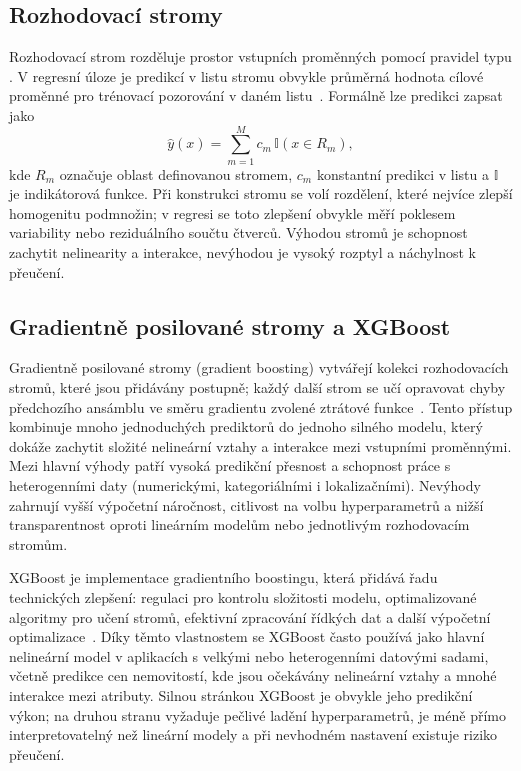 \subsection*{Rozhodovací stromy}
\label{subsec:decision_tree_theory}

Rozhodovací strom rozděluje prostor vstupních proměnných pomocí pravidel typu . V regresní úloze je predikcí v listu stromu obvykle průměrná hodnota cílové proměnné pro trénovací pozorování v daném listu~\cite{Breiman1984CART}. Formálně lze predikci zapsat jako
\begin{equation}
    \hat{y}(x) = \sum_{m=1}^{M} c_m \, \mathbb{I}(x \in R_m),
\end{equation}
kde \(R_m\) označuje oblast definovanou stromem, \(c_m\) konstantní predikci v listu a \(\mathbb{I}\) je indikátorová funkce. Při konstrukci stromu se volí rozdělení, které nejvíce zlepší homogenitu podmnožin; v regresi se toto zlepšení obvykle měří poklesem variability nebo reziduálního součtu čtverců. Výhodou stromů je schopnost zachytit nelinearity a interakce, nevýhodou je vysoký rozptyl a náchylnost k přeučení.

\subsection*{Gradientně posilované stromy a XGBoost}
\label{subsec:gradient_boosting_xgboost}

Gradientně posilované stromy (gradient boosting) vytvářejí kolekci rozhodovacích stromů, které jsou přidávány postupně; každý další strom se učí opravovat chyby předchozího ansámblu ve směru gradientu zvolené ztrátové funkce~\cite{Friedman2001GBM}. Tento přístup kombinuje mnoho jednoduchých prediktorů do jednoho silného modelu, který dokáže zachytit složité nelineární vztahy a interakce mezi vstupními proměnnými. Mezi hlavní výhody patří vysoká predikční přesnost a schopnost práce s heterogenními daty (numerickými, kategoriálními i lokalizačními). Nevýhody zahrnují vyšší výpočetní náročnost, citlivost na volbu hyperparametrů a nižší transparentnost oproti lineárním modelům nebo jednotlivým rozhodovacím stromům.

XGBoost je implementace gradientního boostingu, která přidává řadu technických zlepšení: regulaci pro kontrolu složitosti modelu, optimalizované algoritmy pro učení stromů, efektivní zpracování řídkých dat a další výpočetní optimalizace~\cite{ChenGuestrin2016XGBoost}. Díky těmto vlastnostem se XGBoost často používá jako hlavní nelineární model v aplikacích s velkými nebo heterogenními datovými sadami, včetně predikce cen nemovitostí, kde jsou očekávány nelineární vztahy a mnohé interakce mezi atributy. Silnou stránkou XGBoost je obvykle jeho predikční výkon; na druhou stranu vyžaduje pečlivé ladění hyperparametrů, je méně přímo interpretovatelný než lineární modely a při nevhodném nastavení existuje riziko přeučení.

